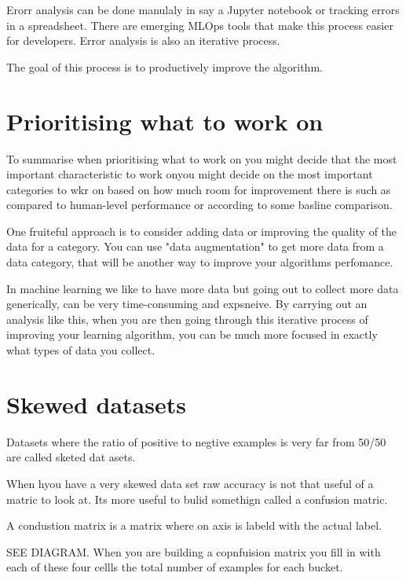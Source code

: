 
Erorr analysis can be done manulaly in say a Jupyter notebook or tracking errors in a spreadsheet.
There are emerging MLOps tools that make this process easier for developers.
Error analysis is also an iterative process.

The goal of this process is to productively improve the algorithm.

\section{Prioritising what to work on}

To summarise when prioritising what to work on you might decide that the most important characteristic to work onyou might decide on the most important categories to wkr on based on how much room for improvement there is such as compared to human-level performance or according to some basline comparison.


One fruiteful approach is to consider adding data or improving the quality of the data for a category.
You can use "data augmentation" to get more data from a data category, that will be another way to improve your algorithms perfomance.



In machine learning we like to have more data but going out to collect more data generically, can be very time-consuming and expsneive.
By carrying out an analysis like this, when you are then going through this iterative process of improving your learning algorithm, you can be much more focused in exactly what types of data you collect.


\section{Skewed datasets}

Datasets where the ratio of positive to negtive examples is very far from 50/50 are called sketed dat asets.

When hyou have a very skewed data set raw accuracy is not that useful of a matric to look at.
Its more useful to bulid somethign called a confusion matric.

A condustion matrix is a matrix where on axis is labeld with the actual label.

SEE DIAGRAM. When you are building a copnfuision matrix you fill in with each of these four cellls the total number of examples for each bucket.


